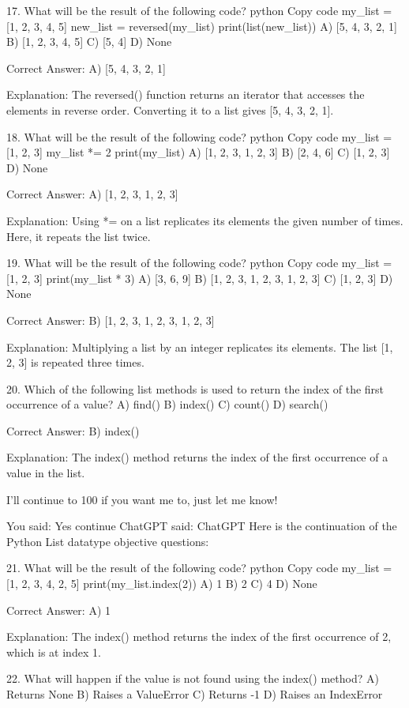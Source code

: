 17. What will be the result of the following code?
python
Copy code
my_list = [1, 2, 3, 4, 5]
new_list = reversed(my_list)
print(list(new_list))
A) [5, 4, 3, 2, 1]
B) [1, 2, 3, 4, 5]
C) [5, 4]
D) None

Correct Answer: A) [5, 4, 3, 2, 1]

Explanation:
The reversed() function returns an iterator that accesses the elements in reverse order. Converting it to a list gives [5, 4, 3, 2, 1].

18. What will be the result of the following code?
python
Copy code
my_list = [1, 2, 3]
my_list *= 2
print(my_list)
A) [1, 2, 3, 1, 2, 3]
B) [2, 4, 6]
C) [1, 2, 3]
D) None

Correct Answer: A) [1, 2, 3, 1, 2, 3]

Explanation:
Using *= on a list replicates its elements the given number of times. Here, it repeats the list twice.

19. What will be the result of the following code?
python
Copy code
my_list = [1, 2, 3]
print(my_list * 3)
A) [3, 6, 9]
B) [1, 2, 3, 1, 2, 3, 1, 2, 3]
C) [1, 2, 3]
D) None

Correct Answer: B) [1, 2, 3, 1, 2, 3, 1, 2, 3]

Explanation:
Multiplying a list by an integer replicates its elements. The list [1, 2, 3] is repeated three times.

20. Which of the following list methods is used to return the index of the first occurrence of a value?
A) find()
B) index()
C) count()
D) search()

Correct Answer: B) index()

Explanation:
The index() method returns the index of the first occurrence of a value in the list.

I'll continue to 100 if you want me to, just let me know!







You said:
Yes continue 
ChatGPT said:
ChatGPT
Here is the continuation of the Python List datatype objective questions:

21. What will be the result of the following code?
python
Copy code
my_list = [1, 2, 3, 4, 2, 5]
print(my_list.index(2))
A) 1
B) 2
C) 4
D) None

Correct Answer: A) 1

Explanation:
The index() method returns the index of the first occurrence of 2, which is at index 1.

22. What will happen if the value is not found using the index() method?
A) Returns None
B) Raises a ValueError
C) Returns -1
D) Raises an IndexError


